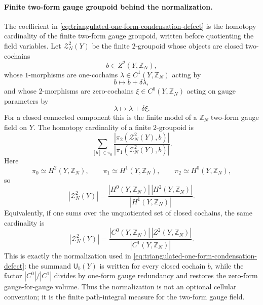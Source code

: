 \paragraph{Finite two-form gauge groupoid behind the normalization.}
The coefficient in
\eqref{eq:triangulated-one-form-condensation-defect} is the homotopy
cardinality of the finite two-form gauge groupoid, written before quotienting
the field variables.  Let
\(\mathcal Z_N^2(Y)\) be the finite \(2\)-groupoid whose objects are closed
two-cochains
\[
  b\in Z^2(Y,\mathbb Z_N),
\]
whose \(1\)-morphisms are one-cochains
\(\lambda\in C^1(Y,\mathbb Z_N)\) acting by
\[
  b\longmapsto b+\delta\lambda,
\]
and whose \(2\)-morphisms are zero-cochains
\(\xi\in C^0(Y,\mathbb Z_N)\) acting on gauge parameters by
\[
  \lambda\longmapsto \lambda+\delta\xi .
\]
For a closed connected component this is the finite model of a
\(\mathbb Z_N\) two-form gauge field on \(Y\).  The homotopy cardinality of a
finite \(2\)-groupoid is
\[
  \sum_{[b]\in\pi_0}
  \frac{|\pi_2(\mathcal Z_N^2(Y),b)|}
       {|\pi_1(\mathcal Z_N^2(Y),b)|}.
\]
Here
\[
  \pi_0\simeq H^2(Y,\mathbb Z_N),\qquad
  \pi_1\simeq H^1(Y,\mathbb Z_N),\qquad
  \pi_2\simeq H^0(Y,\mathbb Z_N),
\]
so
\begin{equation}
  |\mathcal Z_N^2(Y)|
  =
  \frac{|H^0(Y,\mathbb Z_N)|\,|H^2(Y,\mathbb Z_N)|}
       {|H^1(Y,\mathbb Z_N)|}.
  \label{eq:finite-two-form-groupoid-homotopy-cardinality}
\end{equation}
Equivalently, if one sums over the unquotiented set of closed cochains, the
same cardinality is
\begin{equation}
  |\mathcal Z_N^2(Y)|
  =
  \frac{|C^0(Y,\mathbb Z_N)|\,|Z^2(Y,\mathbb Z_N)|}
       {|C^1(Y,\mathbb Z_N)|}.
  \label{eq:finite-two-form-groupoid-cochain-cardinality}
\end{equation}
This is exactly the normalization used in
\eqref{eq:triangulated-one-form-condensation-defect}: the summand
\(\mathsf U_b(Y)\) is written for every closed cochain \(b\), while the factor
\(|C^0|/|C^1|\) divides by one-form gauge redundancy and restores the
zero-form gauge-for-gauge volume.  Thus the normalization is not an optional
cellular convention; it is the finite path-integral measure for the
two-form gauge field.

